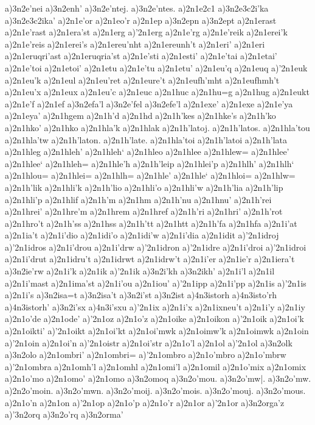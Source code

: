 {a)3n2e'nei
a)3n2enh'
a)3n2e'ntej.
a)3n2e'ntes.
a)2n1e2c1
a)3n2e3c2i'ka
a)3n2e3c2ika'
a)2n1e'or
a)2n1eo'r
a)2n1ep
a)3n2epn
a)3n2ept
a)2n1erast
a)2n1e'rast
a)2n1era'st
a)2n1erg
a)'2n1erg
a)2n1e'rg
a)2n1e'reik
a)2n1erei'k
a)2n1e'reis
a)2n1erei's
a)2n1ereu'nht
a)2n1ereunh't
a)2n1eri'
a)2n1eri
a)2n1eruqri'ast
a)2n1eruqria'st
a)2n1e'sti
a)2n1esti'
a)2n1e'tai
a)2n1etai'
a)2n1e'toi
a)2n1etoi'
a)2n1etu
a)2n1e'tu
a)2n1etu'
a)2n1eu'q
a)2n1euq
a)'2n1euk
a)2n1eu'k
a)2n1eul
a)2n1eu'ret
a)2n1eure't
a)2n1eufh'mht
a)2n1eufhmh't
a)2n1eu'x
a)2n1eux
a)2n1eu'c
a)2n1euc
a)2n1huc
a)2n1hu=g
a)2n1hug
a)2n1eukt
a)2n1e'f
a)2n1ef
a)3n2efa'l
a)3n2e'fel
a)3n2efe'l
a)2n1exe'
a)2n1exe
a)2n1e'ya
a)2n1eya'
a)2n1hgem
a)2n1h'd
a)2n1hd
a)2n1h'kes
a)2n1hke's
a)2n1h'ko
a)2n1hko'
a)2n1hko
a)2n1hla'k
a)2n1hlak
a)2n1h'latoj.
a)2n1h'latos.
a)2n1hla'tou
a)2n1hla'tw
a)2n1h'laton.
a)2n1h'late.
a)2n1hla'toi
a)2n1h'latoi
a)2n1h'lata
a)2n1hleg
a)2n1hleh'
a)2n1hleh`
a)2n1hleo
a)2n1hlee
a)2n1hlew=
a)2n1hlee'
a)2n1hlee`
a)2n1hleh=
a)2n1hle'h
a)2n1h'leip
a)2n1hlei'p
a)2n1hlh'
a)2n1hlh`
a)2n1hlou=
a)2n1hlei=
a)2n1hlh=
a)2n1hle'
a)2n1hle`
a)2n1hloi=
a)2n1hlw=
a)2n1h'lik
a)2n1hli'k
a)2n1h'lio
a)2n1hli'o
a)2n1hli'w
a)2n1h'lia
a)2n1h'lip
a)2n1hli'p
a)2n1hlif
a)2n1h'm
a)2n1hm
a)2n1h'nu
a)2n1hnu'
a)2n1h'rei
a)2n1hrei'
a)2n1hre'm
a)2n1hrem
a)2n1href
a)2n1h'ri
a)2n1hri'
a)2n1h'rot
a)2n1hro't
a)2n1h'ss
a)2n1hss
a)2n1h'tt
a)2n1htt
a)2n1h'fa
a)2n1hfa
a)2n1i'at
a)2n1ia't
a)2n1i'dio
a)2n1idi'o
a)2n1idi'w
a)2n1i'dia
a)2n1idit
a)'2n1idroj
a)'2n1idros
a)2n1i'drou
a)2n1i'drw
a)'2n1idron
a)'2n1idre
a)2n1i'droi
a)'2n1idroi
a)2n1i'drut
a)2n1idru't
a)2n1idrwt
a)2n1idrw't
a)2n1i'er
a)2n1ie'r
a)2n1iera't
a)3n2ie'rw
a)2n1i'k
a)2n1ik
a)'2n1ik
a)3n2i'kh
a)3n2ikh'
a)2n1i'l
a)2n1il
a)2n1i'mast
a)2n1ima'st
a)2n1i'ou
a)2n1iou'
a)'2n1ipp
a)2n1i'pp
a)2n1is
a)'2n1is
a)2n1i's
a)3n2isa=t
a)3n2isa't
a)3n2i'st
a)3n2ist
a)4n3istorh
a)4n3isto'rh
a)4n3istorh'
a)3n2i'sx
a)4n3i'sxu
a)'2n1ix
a)2n1i'x
a)2n1ixneu't
a)2n1i'y
a)2n1iy
a)2n1o'de
a)2n1ode'
a)'2n1oz
a)2n1o'z
a)2n1oike
a)2n1oikon
a)'2n1oik
a)2n1oi'k
a)2n1oikti'
a)'2n1oikt
a)2n1oi'kt
a)2n1oi'mwk
a)2n1oimw'k
a)2n1oimwk
a)2n1oin
a)'2n1oin
a)2n1oi'n
a)'2n1oistr
a)2n1oi'str
a)2n1o'l
a)2n1ol
a)'2n1ol
a)3n2olk
a)3n2olo
a)2n1ombri'
a)2n1ombri=
a)'2n1ombro
a)2n1o'mbro
a)2n1o'mbrw
a)'2n1ombra
a)2n1omh'l
a)2n1omhl
a)2n1omi'l
a)2n1omil
a)2n1o'mix
a)2n1omix
a)2n1o'mo
a)2n1omo'
a)2n1omo
a)3n2omoq
a)3n2o'mou.
a)3n2o'mw|.
a)3n2o'mw.
a)2n2o'moin.
a)3n2o'mwn.
a)3n2o'moij.
a)3n2o'mois.
a)3n2o'mouj.
a)3n2o'mous.
a)2n1o'n
a)2n1on
a)'2n1op
a)2n1o'p
a)2n1o'r
a)2n1or
a)'2n1or
a)3n2orga'z
a)'3n2orq
a)3n2o'rq
a)3n2orma'
}
